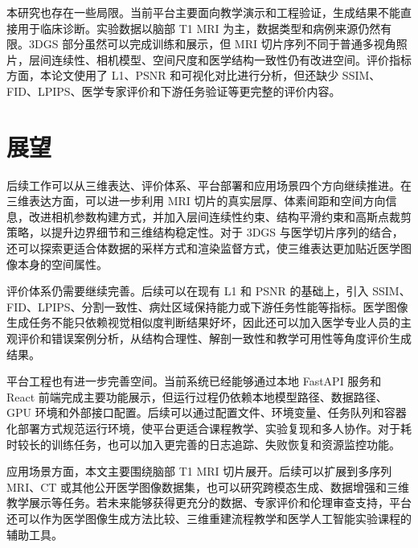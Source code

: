 本研究也存在一些局限。当前平台主要面向教学演示和工程验证，生成结果不能直接用于临床诊断。实验数据以脑部 T1 MRI 为主，数据类型和病例来源仍然有限。3DGS 部分虽然可以完成训练和展示，但 MRI 切片序列不同于普通多视角照片，层间连续性、相机模型、空间尺度和医学结构一致性仍有改进空间。评价指标方面，本论文使用了 L1、PSNR 和可视化对比进行分析，但还缺少 SSIM、FID、LPIPS、医学专家评价和下游任务验证等更完整的评价内容。

\section{展望}
后续工作可以从三维表达、评价体系、平台部署和应用场景四个方向继续推进。在三维表达方面，可以进一步利用 MRI 切片的真实层厚、体素间距和空间方向信息，改进相机参数构建方式，并加入层间连续性约束、结构平滑约束和高斯点裁剪策略，以提升边界细节和三维结构稳定性。对于 3DGS 与医学切片序列的结合，还可以探索更适合体数据的采样方式和渲染监督方式，使三维表达更加贴近医学图像本身的空间属性。

评价体系仍需要继续完善。后续可以在现有 L1 和 PSNR 的基础上，引入 SSIM、FID、LPIPS、分割一致性、病灶区域保持能力或下游任务性能等指标。医学图像生成任务不能只依赖视觉相似度判断结果好坏，因此还可以加入医学专业人员的主观评价和错误案例分析，从结构合理性、解剖一致性和教学可用性等角度评价生成结果。

平台工程也有进一步完善空间。当前系统已经能够通过本地 FastAPI 服务和 React 前端完成主要功能展示，但运行过程仍依赖本地模型路径、数据路径、GPU 环境和外部接口配置。后续可以通过配置文件、环境变量、任务队列和容器化部署方式规范运行环境，使平台更适合课程教学、实验复现和多人协作。对于耗时较长的训练任务，也可以加入更完善的日志追踪、失败恢复和资源监控功能。

应用场景方面，本文主要围绕脑部 T1 MRI 切片展开。后续可以扩展到多序列 MRI、CT 或其他公开医学图像数据集，也可以研究跨模态生成、数据增强和三维教学展示等任务。若未来能够获得更充分的数据、专家评价和伦理审查支持，平台还可以作为医学图像生成方法比较、三维重建流程教学和医学人工智能实验课程的辅助工具。
